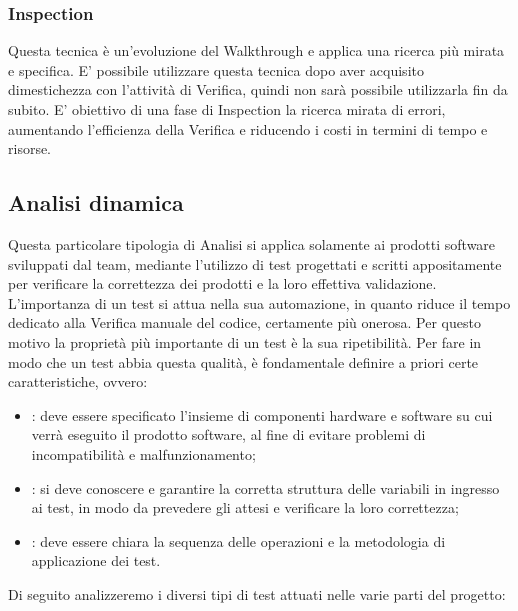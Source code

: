 \subsubsection{Inspection}
\label{3.1.2}
Questa tecnica è un'evoluzione del Walkthrough e applica una ricerca più mirata e specifica. E' possibile utilizzare questa tecnica dopo aver acquisito dimestichezza con l'attività di Verifica, quindi non sarà possibile utilizzarla fin da subito.
E' obiettivo di una fase di Inspection la ricerca mirata di errori, aumentando l'efficienza della Verifica e riducendo i costi in termini di tempo e risorse.

\subsection{Analisi dinamica}
\label{3.2}
Questa particolare tipologia di Analisi si applica solamente ai prodotti software sviluppati dal team, mediante l'utilizzo di test progettati e scritti appositamente per verificare la correttezza dei prodotti e la loro effettiva validazione.
L'importanza di un test si attua nella sua automazione, in quanto riduce il tempo dedicato alla Verifica manuale del codice, certamente più onerosa. Per questo motivo la proprietà più importante di un test è la sua ripetibilità.
Per fare in modo che un test abbia questa qualità, è fondamentale definire a priori certe caratteristiche, ovvero:
\begin{itemize}
\item {}: deve essere specificato l'insieme di componenti hardware e software su cui verrà eseguito il prodotto software, al fine di evitare problemi di incompatibilità e malfunzionamento;
\item {}: si deve conoscere e garantire la corretta struttura delle variabili in ingresso ai test, in modo da prevedere gli  attesi e verificare la loro correttezza;
\item {}: deve essere chiara la sequenza delle operazioni e la metodologia di applicazione dei test.
\end{itemize}
Di seguito analizzeremo i diversi tipi di test attuati nelle varie parti del progetto:
